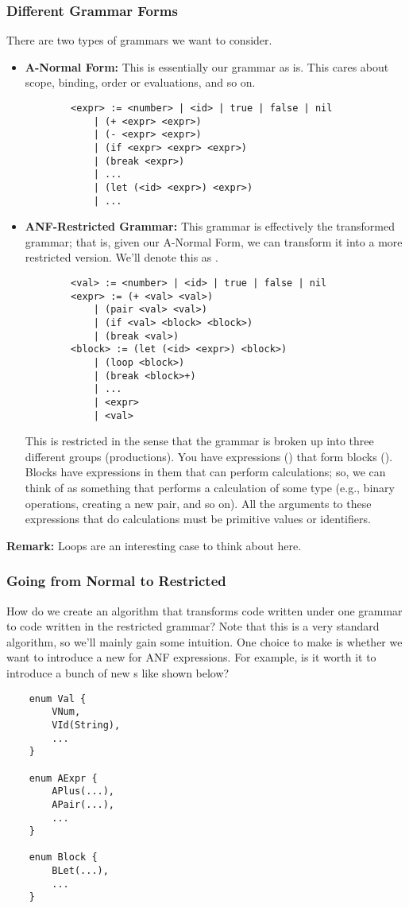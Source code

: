 \documentclass[letterpaper]{article}
\begin{document}
\subsubsection{Different Grammar Forms}
There are two types of grammars we want to consider. 
\begin{itemize}
    \item \textbf{A-Normal Form:} This is essentially our grammar as is. This cares about scope, binding, order or evaluations, and so on. 
    
    \begin{verbatim}
        <expr> := <number> | <id> | true | false | nil 
            | (+ <expr> <expr>)
            | (- <expr> <expr>)
            | (if <expr> <expr> <expr>)
            | (break <expr>)
            | ... 
            | (let (<id> <expr>) <expr>)
            | ... \end{verbatim}
    \item \textbf{ANF-Restricted Grammar:} This grammar is effectively the transformed grammar; that is, given our A-Normal Form, we can transform it into a more restricted version. We'll denote this as .
    \begin{verbatim}
        <val> := <number> | <id> | true | false | nil 
        <expr> := (+ <val> <val>) 
            | (pair <val> <val>) 
            | (if <val> <block> <block>)
            | (break <val>)
        <block> := (let (<id> <expr>) <block>)
            | (loop <block>)
            | (break <block>+)
            | ... 
            | <expr>
            | <val>\end{verbatim}
        This is restricted in the sense that the grammar is broken up into three different groups (productions). You have expressions () that form blocks (). Blocks have expressions in them that can perform calculations; so, we can think of  as something that performs a calculation of some type (e.g., binary operations, creating a new pair, and so on). All the arguments to these expressions that do calculations must be primitive values or identifiers.  
\end{itemize}
\textbf{Remark:} Loops are an interesting case to think about here. 

\subsubsection{Going from Normal to Restricted}
How do we create an algorithm that transforms code written under one grammar to code written in the restricted grammar? Note that this is a very standard algorithm, so we'll mainly gain some intuition. One choice to make is whether we want to introduce a new  for ANF expressions. For example, is it worth it to introduce a bunch of new s like shown below?
\begin{verbatim}
    enum Val {
        VNum,
        VId(String),
        ...
    }

    enum AExpr {
        APlus(...),
        APair(...),
        ... 
    }

    enum Block {
        BLet(...),
        ...
    }\end{verbatim}
\end{document}
